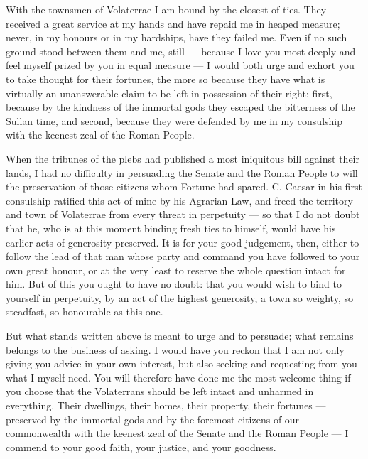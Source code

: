 

 With the townsmen of Volaterrae I am bound by the closest of ties. They received a great service at my hands and have repaid me in heaped measure; never, in my honours or in my hardships, have they failed me. Even if no such ground stood between them and me, still --- because I love you most deeply and feel myself prized by you in equal measure --- I would both urge and exhort you to take thought for their fortunes, the more so because they have what is virtually an unanswerable claim to be left in possession of their right: first, because by the kindness of the immortal gods they escaped the bitterness of the Sullan time, and second, because they were defended by me in my consulship with the keenest zeal of the Roman People.

 When the tribunes of the plebs had published a most iniquitous bill against their lands, I had no difficulty in persuading the Senate and the Roman People to will the preservation of those citizens whom Fortune had spared. C. Caesar in his first consulship ratified this act of mine by his Agrarian Law, and freed the territory and town of Volaterrae from every threat in perpetuity --- so that I do not doubt that he, who is at this moment binding fresh ties to himself, would have his earlier acts of generosity preserved. It is for your good judgement, then, either to follow the lead of that man whose party and command you have followed to your own great honour, or at the very least to reserve the whole question intact for him. But of this you ought to have no doubt: that you would wish to bind to yourself in perpetuity, by an act of the highest generosity, a town so weighty, so steadfast, so honourable as this one.

 But what stands written above is meant to urge and to persuade; what remains belongs to the business of asking. I would have you reckon that I am not only giving you advice in your own interest, but also seeking and requesting from you what I myself need. You will therefore have done me the most welcome thing if you choose that the Volaterrans should be left intact and unharmed in everything. Their dwellings, their homes, their property, their fortunes --- preserved by the immortal gods and by the foremost citizens of our commonwealth with the keenest zeal of the Senate and the Roman People --- I commend to your good faith, your justice, and your goodness.

